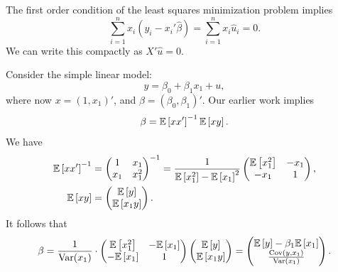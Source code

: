 \begin{remark}
	The first order condition of the least squares minimization problem implies
	\[
		\sum_{i=1}^n x_i(y_i-x_i'\hat\beta)=\sum_{i=1}^n x_i\hat u_i=0.
	\]
	We can write this compactly as $X'\hat{u} = 0$.
\end{remark}

\begin{example}
	Consider the simple linear model:
	\[
		y=\beta_0+\beta_1x_1+u,
	\]
	where now $x=(1,x_1)'$, and $\beta=(\beta_0,\beta_1)'$. Our earlier work implies
	\[
		\beta=\mathbb{E}\left[xx'\right]^{-1}\mathbb{E}\left[xy\right].
	\]
	We have
	\begin{align*}
		\mathbb{E}\left[xx'\right]^{-1}
		&=\begin{pmatrix}
			1   & x_1   \\
			x_1 & x_1^2
		\end{pmatrix}^{-1}
		=\frac{1}{\mathbb{E}\left[x_1^2\right]-\mathbb{E}\left[x_1\right]^2}\begin{pmatrix}
			\mathbb{E}\left[x_1^2\right] & -x_1 \\
			-x_1                 & 1
		\end{pmatrix}, \\
		\mathbb{E}\left[xy\right]
		&=\begin{pmatrix}
			\mathbb{E}\left[y\right] \\
			\mathbb{E}\left[x_1y\right]
		\end{pmatrix}.
	\end{align*}
	It follows that
	\[
		\beta=\frac{1}{\operatorname{Var}(x_1)}\cdot\begin{pmatrix}
			\mathbb{E}\left[x_1^2\right] & -\mathbb{E}\left[x_1\right] \\
			-\mathbb{E}\left[x_1\right]  & 1
		\end{pmatrix}\begin{pmatrix}
			\mathbb{E}\left[y\right] \\
			\mathbb{E}\left[x_1y\right]
		\end{pmatrix}
		=\begin{pmatrix}
			\mathbb{E}\left[y\right]-\beta_1\mathbb{E}\left[x_1\right] \\
			\frac{\operatorname{Cov}(y,x_1)}{\operatorname{Var}(x_1)}
		\end{pmatrix}.
	\]
\end{example}

